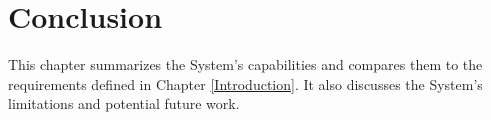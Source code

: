 \chapter{Conclusion}

\label{Conclusion}

This chapter summarizes the System's capabilities and compares them to the requirements defined in Chapter 
\ref{Introduction}. It also discusses the System's limitations and potential future work.

